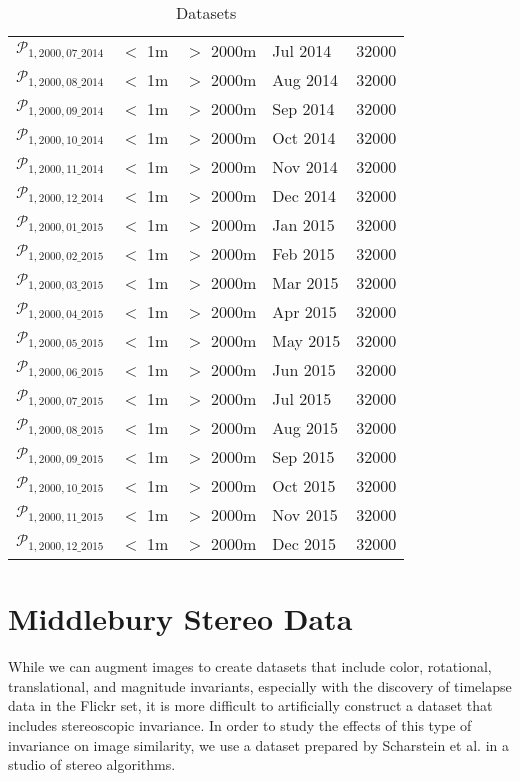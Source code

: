 \begin{table}
\begin{tabular}{c >{\centering\arraybackslash}m{3.2cm} >{\centering\arraybackslash}m{3cm} >{\centering\arraybackslash}m{2cm} c}
		$\mathcal{P}_{1,2000,07\_2014}$ & $<$ 1m & $>$ 2000m & Jul 2014  & 32000\\
		$\mathcal{P}_{1,2000,08\_2014}$ & $<$ 1m & $>$ 2000m & Aug 2014  & 32000\\
		$\mathcal{P}_{1,2000,09\_2014}$ & $<$ 1m & $>$ 2000m & Sep 2014  & 32000\\
		$\mathcal{P}_{1,2000,10\_2014}$ & $<$ 1m & $>$ 2000m & Oct 2014  & 32000\\
		$\mathcal{P}_{1,2000,11\_2014}$ & $<$ 1m & $>$ 2000m & Nov 2014  & 32000\\
		$\mathcal{P}_{1,2000,12\_2014}$ & $<$ 1m & $>$ 2000m & Dec 2014  & 32000\\
		$\mathcal{P}_{1,2000,01\_2015}$ & $<$ 1m & $>$ 2000m & Jan 2015  & 32000\\
		$\mathcal{P}_{1,2000,02\_2015}$ & $<$ 1m & $>$ 2000m & Feb 2015  & 32000\\
		$\mathcal{P}_{1,2000,03\_2015}$ & $<$ 1m & $>$ 2000m & Mar 2015  & 32000\\
		$\mathcal{P}_{1,2000,04\_2015}$ & $<$ 1m & $>$ 2000m & Apr 2015  & 32000\\
		$\mathcal{P}_{1,2000,05\_2015}$ & $<$ 1m & $>$ 2000m & May 2015  & 32000\\
		$\mathcal{P}_{1,2000,06\_2015}$ & $<$ 1m & $>$ 2000m & Jun 2015  & 32000\\
		$\mathcal{P}_{1,2000,07\_2015}$ & $<$ 1m & $>$ 2000m & Jul 2015  & 32000\\
		$\mathcal{P}_{1,2000,08\_2015}$ & $<$ 1m & $>$ 2000m & Aug 2015  & 32000\\
		$\mathcal{P}_{1,2000,09\_2015}$ & $<$ 1m & $>$ 2000m & Sep 2015  & 32000\\
		$\mathcal{P}_{1,2000,10\_2015}$ & $<$ 1m & $>$ 2000m & Oct 2015  & 32000\\
		$\mathcal{P}_{1,2000,11\_2015}$ & $<$ 1m & $>$ 2000m & Nov 2015  & 32000\\
		$\mathcal{P}_{1,2000,12\_2015}$ & $<$ 1m & $>$ 2000m & Dec 2015  & 32000\\
		\bottomrule
	\end{tabular}
	\caption{Datasets}
	\label{table:datasets}
\end{table}


\section{Middlebury Stereo Data}
While we can augment images to create datasets that include color, rotational, translational, and magnitude invariants, especially with the discovery of timelapse data in the Flickr set, it is more difficult to artificially construct a dataset that includes stereoscopic invariance. In order to study the effects of this type of invariance on image similarity, we use a dataset prepared by Scharstein et al. in a studio of stereo algorithms.\cite{scharstein2014high}

